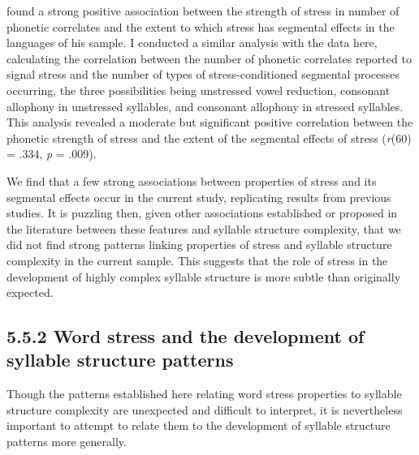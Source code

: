  \citet{Schiering2007} found a strong positive association between the strength of stress in number of phonetic correlates and the extent to which stress has segmental effects in the languages of his sample. I conducted a similar analysis with the data here, calculating the correlation between the number of phonetic correlates reported to signal stress and the number of types of stress-conditioned segmental processes occurring, the three possibilities being unstressed vowel reduction, consonant allophony in unstressed syllables, and consonant allophony in stressed syllables. This analysis revealed a moderate but significant positive correlation between the phonetic strength of stress and the extent of the segmental effects of stress (\textit{r}(60) = .334, \textit{p} = .009).



  We find that a few strong associations between properties of stress and its segmental effects occur in the current study, replicating results from previous studies. It is puzzling then, given other associations established or proposed in the literature between these features and syllable structure complexity, that we did not find strong patterns linking properties of stress and syllable structure complexity in the current sample. This suggests that the role of stress in the development of highly complex syllable structure is more subtle than originally expected.


\subsection{5.5.2 Word stress and the development of syllable structure patterns}

  Though the patterns established here relating word stress properties to syllable structure complexity are unexpected and difficult to interpret, it is nevertheless important to attempt to relate them to the development of syllable structure patterns more generally.




